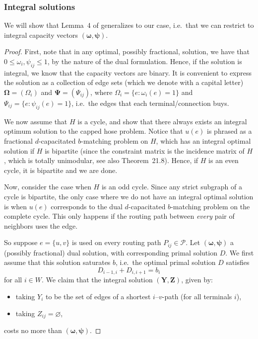 \subsubsection{Integral solutions}
We will show that Lemma~4 of \cite{bosman2017exploring} generalizes to our case, i.e.\ that we can restrict to integral capacity vectors $(\boldsymbol \omega, \boldsymbol \psi)$.
\begin{proof}
    First, note that in any optimal, possibly fractional, solution, we have that $0 \le \omega_i, \psi_{ij} \le 1$, by the nature of the dual formulation.
    Hence, if the solution is integral, we know that the capacity vectors are binary.
    It is convenient to express the solution as a collection of edge sets (which we denote with a capital letter) $\boldsymbol \Omega = (\Omega_i)$ and $\boldsymbol \Psi = (\Psi_{ij})$, where $\Omega_i = \{ e : \omega_i(e) = 1 \}$ and $\Psi_{ij} = \{ e : \psi_{ij}(e) = 1 \}$, i.e.\ the edges that each terminal/connection buys.

    We now assume that $H$ is a cycle, and show that there always exists an integral optimum solution to the capped hose problem.
    Notice that $u(e)$ is phrased as a fractional $d$-capacitated $b$-matching problem on $H$, which has an integral optimal solution if $H$ is bipartite (since the constraint matrix is the incidence matrix of $H$, which is totally unimodular, see also \cite{schrijver2003combinatorial} Theorem~21.8).
    Hence, if $H$ is an even cycle, it is bipartite and we are done.

    Now, consider the case when $H$ is an odd cycle.
    Since any strict subgraph of a cycle is bipartite, the only case where we do not have an integral optimal solution is when $u(e)$ corresponds to the dual $d$-capacitated $b$-matching problem on the complete cycle.
    This only happens if the routing path between \emph{every} pair of neighbors uses the edge.

    So suppose $e = \{u, v\}$ is used on every routing path $P_{ij} \in \mathcal P$.
    Let $(\boldsymbol \omega, \boldsymbol \psi)$ a (possibly fractional) dual solution, with corresponding primal solution $D$.
    We first assume that this solution saturates $b$, i.e.\ the optimal primal solution $D$ satisfies
    \[
        D_{i-1,i} + D_{i,i+1} = b_i
    \]
    for all $i \in W$.
    We claim that the integral solution $(\boldsymbol Y, \boldsymbol Z)$, given by:
    \begin{itemize}
        \item taking $Y_i$ to be the set of edges of a shortest $i$--$v$-path (for all terminals $i$),
        \item taking $Z_{ij} = \varnothing$,
    \end{itemize}
    costs no more than $(\boldsymbol \omega, \boldsymbol \psi)$.


\end{proof}
